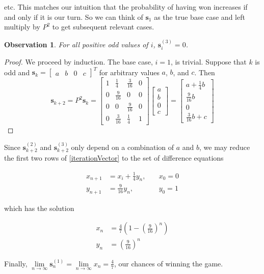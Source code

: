\documentclass[]{article}
\newtheorem*{obs}{Observation}
\begin{document}
etc. This matches our intuition that the probability of having won increases if and only if it is our turn. So we can think of $\mathbf{s}_1$ as the true base case and left multiply by $P^2$ to get subsequent relevant cases.

\begin{obs}
	For all positive odd values of $i$, $\mathbf{s}_i^{(3)}=0$.
\end{obs}
\begin{proof}
	We proceed by induction. The base case, $i=1$, is trivial. Suppose that $k$ is odd and $\mathbf{s}_k = \begin{bmatrix}a & b & 0 & c\end{bmatrix}^T$ for arbitrary values $a$, $b$, and $c$. Then
	\begin{equation}\label{iterationVector}
	\mathbf{s}_{k+2} = P^2 \mathbf{s}_k =
	\begin{bmatrix}
	1 & \frac{1}{4} & \frac{3}{16} & 0\\
	0 & \frac{9}{16} & 0 & 0\\
	0 & 0 & \frac{9}{16} & 0\\
	0 & \frac{3}{16} & \frac{1}{4} & 1
	\end{bmatrix}
	\begin{bmatrix}a\\ b\\ 0\\ c \end{bmatrix} = 
	\begin{bmatrix}
	a + \frac{1}{4}b\\
	\frac{9}{16}b\\ 0\\
	\frac{3}{16}b + c
	\end{bmatrix}
	\end{equation}
\end{proof}

Since $\mathbf{s}_{k+2}^{(2)}$ and $\mathbf{s}_{k+2}^{(3)}$ only depend on a combination of $a$ and $b$, we may reduce the first two rows of \eqref{iterationVector} to the set of difference equations

\begin{equation}\begin{aligned}
x_{n+1} &= x_i + \frac{1}{4}y_n, \quad &x_0 = 0\\
y_{n+1} &= \frac{9}{16}y_n, \quad &y_0 = 1
\end{aligned}\end{equation}

which has the solution 

\begin{equation}\begin{aligned}
x_{n} &= \frac{4}{7} \left(1 - \left(\frac{9}{16}\right)^n\right)\\
y_{n} &= \left(\frac{9}{16}\right)^n
\end{aligned}\end{equation}

Finally, $\lim\limits_{n \rightarrow\infty} \mathbf{s}_n^{(1)} = \lim\limits_{n\rightarrow\infty} x_{n} = \frac{4}{7}$, our chances of winning the game.
\end{document}
